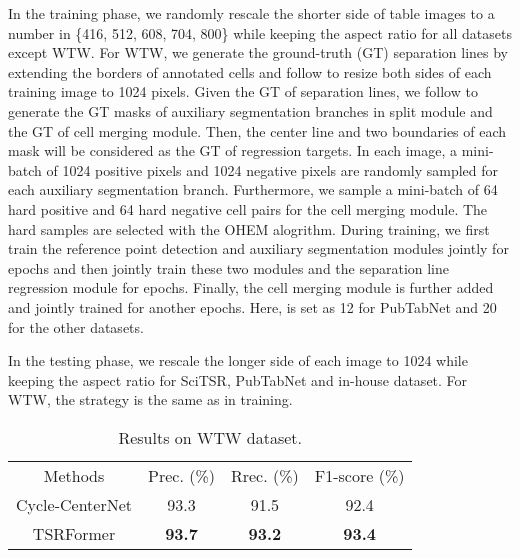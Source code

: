 \documentclass[sigconf]{acmart}
\begin{document}
In the training phase, we randomly rescale the shorter side of table images to a number in \{416, 512, 608, 704, 800\} while keeping the aspect ratio for all datasets except WTW. For WTW, we generate the ground-truth (GT) separation lines by extending the borders of annotated cells and follow \cite{long2021parsing} to resize both sides of each training image to 1024 pixels. Given the GT of separation lines, we follow \cite{ma2022robust} to generate the GT masks of auxiliary segmentation branches in split module and the GT of cell merging module. Then, the center line and two boundaries of each mask will be considered as the GT of regression targets. In each image, a mini-batch of 1024 positive pixels and 1024 negative pixels are randomly sampled for each auxiliary segmentation branch. Furthermore, we sample a mini-batch of 64 hard positive and 64 hard negative cell pairs for the cell merging module. The hard samples are selected with the OHEM \cite{shrivastava2016ohem} alogrithm. During training, we first train the reference point detection and auxiliary segmentation modules jointly for  epochs and then jointly train these two modules and the separation line regression module for  epochs. Finally, the cell merging module is further added and jointly trained for another  epochs. Here,  is set as 12 for PubTabNet and 20 for the other datasets. 

In the testing phase, we rescale the longer side of each image to 1024 while keeping the aspect ratio for SciTSR, PubTabNet and in-house dataset. For WTW, the strategy is the same as in training. 

\begin{table}
\small
\setlength{\tabcolsep}{1.5mm} 
\caption{Results on WTW dataset.}
\label{tab:WTW}
\begin{tabular}{cccc}
    \hline\noalign{\smallskip}
Methods & Prec. (\%) & Rrec. (\%) & F1-score (\%)\\
    \noalign{\smallskip}
    \hline
    \noalign{\smallskip}
    Cycle-CenterNet \cite{long2021parsing}  & 93.3 & 91.5 & 92.4\\
    \hline
    TSRFormer  & \textbf{93.7} & \textbf{93.2} & \textbf{93.4}\\
    \hline
\end{tabular}
\end{table}
\end{document}
